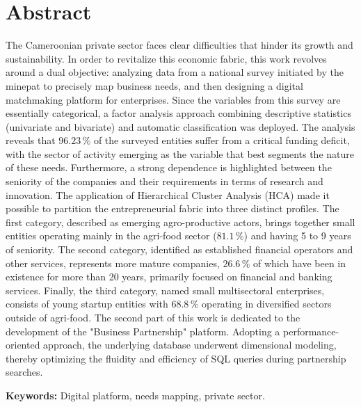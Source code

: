 \documentclass[12pt, a4paper, oneside]{report}
\begin{document}
	\vspace{1cm}

	\chapter*{Abstract}
	\thispagestyle{plain}
	The Cameroonian private sector faces clear difficulties that hinder its growth and sustainability. In order to revitalize this economic fabric, this work revolves around a dual objective: analyzing data from a national survey initiated by the \gls{minepat} to precisely map business needs, and then designing a digital matchmaking platform for enterprises. Since the variables from this survey are essentially categorical, a factor analysis approach combining descriptive statistics (univariate and bivariate) and automatic classification was deployed. The analysis reveals that $96.23\,\%$ of the surveyed entities suffer from a critical funding deficit, with the sector of activity emerging as the variable that best segments the nature of these needs. Furthermore, a strong dependence is highlighted between the seniority of the companies and their requirements in terms of research and innovation. The application of Hierarchical Cluster Analysis (HCA) made it possible to partition the entrepreneurial fabric into three distinct profiles. The first category, described as emerging agro-productive actors, brings together small entities operating mainly in the agri-food sector ($81.1\,\%$) and having 5 to 9 years of seniority. The second category, identified as established financial operators and other services, represents more mature companies, $26.6\,\%$ of which have been in existence for more than 20 years, primarily focused on financial and banking services. Finally, the third category, named small multisectoral enterprises, consists of young startup entities with $68.8\,\%$ operating in diversified sectors outside of agri-food. The second part of this work is dedicated to the development of the "Business Partnership" platform. Adopting a performance-oriented approach, the underlying database underwent dimensional modeling, thereby optimizing the fluidity and efficiency of SQL queries during partnership searches.\vspace{0.5cm}
	
	 \textbf{Keywords:} Digital platform, needs mapping, private sector.
	
\end{document}
